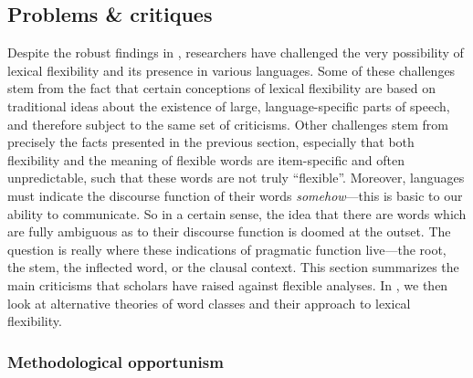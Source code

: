 \subsection{Problems \& critiques}
\label{sec:2.3.3}

Despite the robust findings in , researchers have challenged the very possibility of lexical flexibility and its presence in various languages. Some of these challenges stem from the fact that certain conceptions of lexical flexibility are based on traditional ideas about the existence of large, language-specific parts of speech, and therefore subject to the same set of criticisms. Other challenges stem from precisely the facts presented in the previous section, especially that both flexibility and the meaning of flexible words are item-specific and often unpredictable, such that these words are not truly \enquote{flexible}. Moreover, languages must indicate the discourse function of their words \emph{somehow}—this is basic to our ability to communicate. So in a certain sense, the idea that there are words which are fully ambiguous as to their discourse function is doomed at the outset. The question is really where these indications of pragmatic function live—the root, the stem, the inflected word, or the clausal context. This section summarizes the main criticisms that scholars have raised against flexible analyses. In , we then look at alternative theories of word classes and their approach to lexical flexibility.

\subsubsection{Methodological opportunism}
\label{sec:2.3.3.1}

